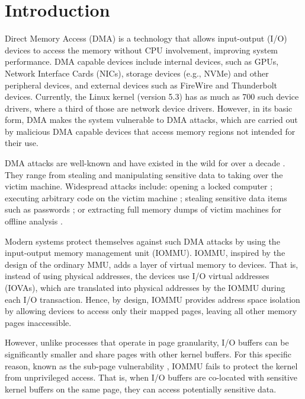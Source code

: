 \section{Introduction}

Direct Memory Access (DMA) is a technology that allows input-output (I/O) devices to access the memory without CPU involvement, improving system performance.
DMA capable devices include internal devices, such as GPUs, Network Interface Cards (NICs), storage devices (e.g., NVMe) and other peripheral devices, and external devices such as FireWire and Thunderbolt devices. Currently, the Linux kernel (version 5.3) has as much as 700 such device drivers, where a third of those are network device drivers. However, in its basic form, DMA makes the system vulnerable to DMA attacks, which are carried out by malicious DMA capable devices that access memory regions not intended for their use. 



DMA attacks are well-known and have existed in the wild for over a decade \cite{Dor04,BDK10,thunder}. They range from stealing and manipulating sensitive data to taking over the victim machine. Widespread attacks include: opening a locked computer \cite{MM, Fin14}; executing arbitrary code on the victim machine \cite{Fri16, Woj08, AD10,thunder}; stealing sensitive data items such as passwords \cite{SB12, LKV13, Cim16, BR12}; or extracting full memory dumps of victim machines for offline analysis \cite{MM, Vol, Fin14, GA10}. 

Modern systems protect themselves against such DMA attacks by using the input-output memory management unit (IOMMU). IOMMU, inspired by the design of the ordinary MMU, adds a layer of virtual memory to devices. That is, instead of using physical addresses, the devices use I/O virtual addresses (IOVAs), which are translated into physical addresses by the IOMMU during each I/O transaction. Hence, by design, IOMMU provides address space isolation by allowing devices to access only their mapped pages, leaving all other memory pages inaccessible. 

However, unlike processes that operate in page granularity, I/O buffers can be significantly smaller and share pages with other kernel buffers. For this specific reason, known as the sub-page vulnerability \cite{MMT16,thunder}, IOMMU fails to protect the kernel from unprivileged access. That is, when I/O buffers are co-located with sensitive kernel buffers on the same page, they can access potentially sensitive data. 

